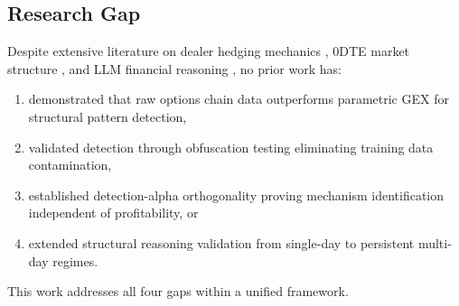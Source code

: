 \subsection{Research Gap}

Despite extensive literature on dealer hedging mechanics \citep{ni2005stock,garleanu2009demand}, 0DTE market structure \citep{dim2025zero}, and LLM financial reasoning \citep{lopez2023can,kim2024financial}, no prior work has:
\begin{enumerate}
\item demonstrated that raw options chain data outperforms parametric GEX for structural pattern detection,
\item validated detection through obfuscation testing eliminating training data contamination,
\item established detection-alpha orthogonality proving mechanism identification independent of profitability, or
\item extended structural reasoning validation from single-day to persistent multi-day regimes.
\end{enumerate}
This work addresses all four gaps within a unified framework.
